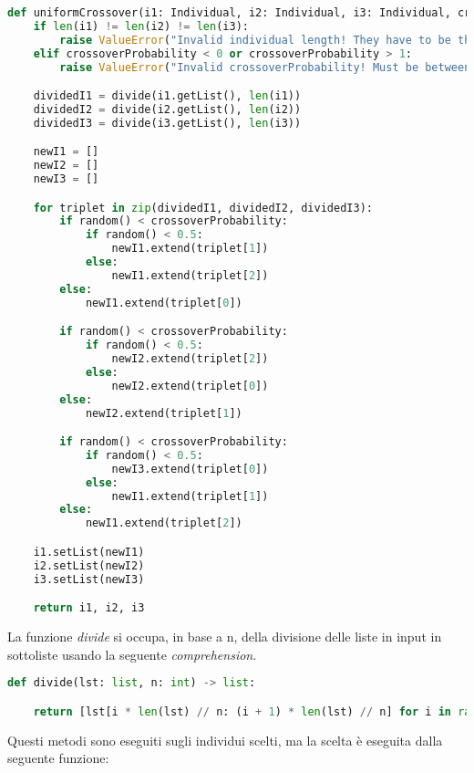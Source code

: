 \documentclass{article}
\begin{document}
\begin{lstlisting}[language=Python]
def uniformCrossover(i1: Individual, i2: Individual, i3: Individual, crossoverProbability: float) -> tuple[Individual, Individual, Individual]:
    if len(i1) != len(i2) != len(i3):
        raise ValueError("Invalid individual length! They have to be the same.")
    elif crossoverProbability < 0 or crossoverProbability > 1:
        raise ValueError("Invalid crossoverProbability! Must be between 0 and 1.")

    dividedI1 = divide(i1.getList(), len(i1))
    dividedI2 = divide(i2.getList(), len(i2))
    dividedI3 = divide(i3.getList(), len(i3))

    newI1 = []
    newI2 = []
    newI3 = []

    for triplet in zip(dividedI1, dividedI2, dividedI3):
        if random() < crossoverProbability:
            if random() < 0.5:
                newI1.extend(triplet[1])
            else:
                newI1.extend(triplet[2])
        else:
            newI1.extend(triplet[0])

        if random() < crossoverProbability:
            if random() < 0.5:
                newI2.extend(triplet[2])
            else:
                newI2.extend(triplet[0])
        else:
            newI2.extend(triplet[1])

        if random() < crossoverProbability:
            if random() < 0.5:
                newI3.extend(triplet[0])
            else:
                newI1.extend(triplet[1])
        else:
            newI1.extend(triplet[2])

    i1.setList(newI1)
    i2.setList(newI2)
    i3.setList(newI3)

    return i1, i2, i3
        \end{lstlisting}


La funzione \textit{divide} si occupa, in base a n, della divisione delle liste in input in sottoliste usando la seguente \textit{comprehension}.



     \begin{lstlisting}[language=Python]
def divide(lst: list, n: int) -> list:

    return [lst[i * len(lst) // n: (i + 1) * len(lst) // n] for i in range(n)]
        \end{lstlisting}


\pagebreak




Questi metodi sono eseguiti sugli individui scelti, ma la scelta è eseguita dalla seguente funzione:
\end{document}
